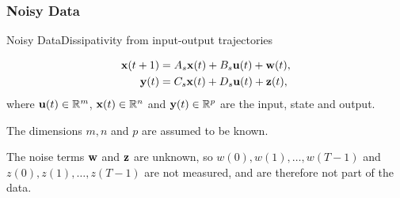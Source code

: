 \documentclass[aspectratio=169, handout, 10pt, hyperref=colorlinks]{beamer}
\begin{document}
\subsubsection{Noisy Data}
\begin{frame}[allowframebreaks]{Noisy Data}{Dissipativity from input-output trajectories}
    \begin{problem}
        \begin{equation}
            \begin{aligned}
            \mathbf{x}(t+1)&=A_{s} \mathbf{x}(t)+B_{s} \mathbf{u}(t)  + \mathbf{w}(t),\\
            \mathbf{y}(t)&=C_{s} \mathbf{x}(t)+D_{s} \mathbf{u}(t) + \mathbf{z}(t),  \end{aligned}
        \end{equation}
        where $\mathbf{u}(t) \in \mathbb{R}^m$, $\mathbf{x}(t) \in \mathbb{R}^n$ and $\mathbf{y}(t) \in\mathbb{R}^{p}$ are the input, state and output.

        The dimensions $m,n$ and $p$ are assumed to be known. 
        
        The noise terms $\mathbf{w}$ and $\mathbf{z}$ are unknown, so $w(0),w(1),\dots,w(T-1)$ and  $z(0),z(1),\dots,z(T-1)$ are not measured, and are therefore not part of the data. 
    \end{problem}
\end{frame}
\end{document}

